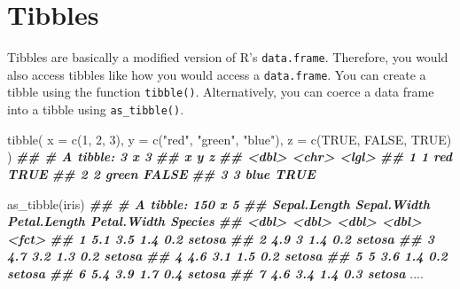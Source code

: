 \documentclass[
]{book}
\newenvironment{Shaded}{\begin{snugshade}}{\end{snugshade}}
\newcommand{\AttributeTok}[1]{\textcolor[rgb]{0.77,0.63,0.00}{#1}}
\newcommand{\ConstantTok}[1]{\textcolor[rgb]{0.00,0.00,0.00}{#1}}
\newcommand{\DecValTok}[1]{\textcolor[rgb]{0.00,0.00,0.81}{#1}}
\newcommand{\DocumentationTok}[1]{\textcolor[rgb]{0.56,0.35,0.01}{\textbf{\textit{#1}}}}
\newcommand{\FunctionTok}[1]{\textcolor[rgb]{0.00,0.00,0.00}{#1}}
\newcommand{\NormalTok}[1]{#1}
\newcommand{\StringTok}[1]{\textcolor[rgb]{0.31,0.60,0.02}{#1}}
\begin{document}
\hypertarget{tibbles}{%
\section{Tibbles}\label{tibbles}}

Tibbles are basically a modified version of R's \texttt{data.frame}. Therefore, you would also access tibbles like how you would access a \texttt{data.frame}. You can create a tibble using the function \texttt{tibble()}. Alternatively, you can coerce a data frame into a tibble using \texttt{as\_tibble()}.

\begin{Shaded}
\begin{Highlighting}[]
\FunctionTok{tibble}\NormalTok{(}
  \AttributeTok{x =} \FunctionTok{c}\NormalTok{(}\DecValTok{1}\NormalTok{, }\DecValTok{2}\NormalTok{, }\DecValTok{3}\NormalTok{),}
  \AttributeTok{y =} \FunctionTok{c}\NormalTok{(}\StringTok{"red"}\NormalTok{, }\StringTok{"green"}\NormalTok{, }\StringTok{"blue"}\NormalTok{),}
  \AttributeTok{z =} \FunctionTok{c}\NormalTok{(}\ConstantTok{TRUE}\NormalTok{, }\ConstantTok{FALSE}\NormalTok{, }\ConstantTok{TRUE}\NormalTok{)}
\NormalTok{)}
\DocumentationTok{\#\# \# A tibble: 3 x 3}
\DocumentationTok{\#\#       x y     z    }
\DocumentationTok{\#\#   \textless{}dbl\textgreater{} \textless{}chr\textgreater{} \textless{}lgl\textgreater{}}
\DocumentationTok{\#\# 1     1 red   TRUE }
\DocumentationTok{\#\# 2     2 green FALSE}
\DocumentationTok{\#\# 3     3 blue  TRUE}

\FunctionTok{as\_tibble}\NormalTok{(iris)}
\DocumentationTok{\#\# \# A tibble: 150 x 5}
\DocumentationTok{\#\#    Sepal.Length Sepal.Width Petal.Length Petal.Width Species}
\DocumentationTok{\#\#           \textless{}dbl\textgreater{}       \textless{}dbl\textgreater{}        \textless{}dbl\textgreater{}       \textless{}dbl\textgreater{} \textless{}fct\textgreater{}  }
\DocumentationTok{\#\#  1          5.1         3.5          1.4         0.2 setosa }
\DocumentationTok{\#\#  2          4.9         3            1.4         0.2 setosa }
\DocumentationTok{\#\#  3          4.7         3.2          1.3         0.2 setosa }
\DocumentationTok{\#\#  4          4.6         3.1          1.5         0.2 setosa }
\DocumentationTok{\#\#  5          5           3.6          1.4         0.2 setosa }
\DocumentationTok{\#\#  6          5.4         3.9          1.7         0.4 setosa }
\DocumentationTok{\#\#  7          4.6         3.4          1.4         0.3 setosa }
\NormalTok{....}
\end{Highlighting}
\end{Shaded}
\end{document}
